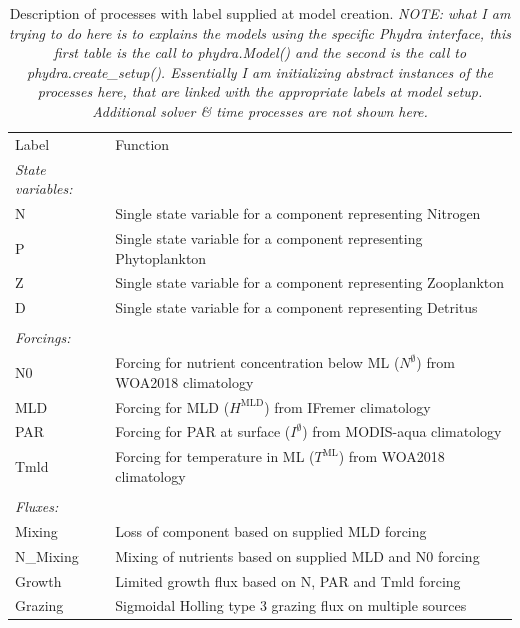 \documentclass[journal abbreviations, manuscript]{copernicus}
\begin{document}
\begin{table}[t]
\caption{Description of processes with label supplied at model creation. \textit{NOTE: what I am trying to do here is to explains the models using the specific Phydra interface, this first table is the call to phydra.Model() and the second is the call to phydra.create\_setup(). Essentially I am initializing abstract instances of the processes here, that are linked with the appropriate labels at model setup. Additional solver \& time processes are not shown here.}}
\begin{tabular}{l l}
Label & Function \\
\tophline
\textit{State variables:} \\
N & Single state variable for a component representing Nitrogen \\
P & Single state variable for a component representing Phytoplankton \\
Z & Single state variable for a component representing Zooplankton \\
D & Single state variable for a component representing Detritus \\
\\

\textit{Forcings:} \\
N0 & Forcing for nutrient concentration below ML ($N^\emptyset$) from WOA2018 climatology\\
MLD & Forcing for MLD ($H^{\mathrm{MLD}}$) from IFremer climatology\\
PAR & Forcing for PAR at surface ($I^\emptyset$) from MODIS-aqua climatology\\
Tmld & Forcing for temperature in ML ($T^{\mathrm{ML}}$) from WOA2018 climatology\\
\\

\textit{Fluxes:} \\
Mixing & Loss of component based on supplied MLD forcing \\
N\_Mixing & Mixing of nutrients based on supplied MLD and N0 forcing \\

Growth & Limited growth flux based on N, PAR and Tmld forcing \\

Grazing & Sigmoidal Holling type 3 grazing flux on multiple sources \\


\end{tabular}
\end{table}
\end{document}
